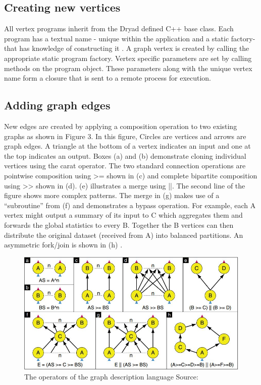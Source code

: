 \documentclass[9pt,twocolumn,twoside]{../../styles/osajnl}
\begin{document}
\subsection{Creating new vertices}
All vertex programs inherit from the Dryad defined C++ base
class. Each program has a textual name - unique within the application
and a static factory- that has knowledge of constructing it
\cite{DryadMSR3}. A graph vertex is created by calling the appropriate
static program factory. Vertex specific parameters are set by calling
methods on the program object. These parameters along with the unique
vertex name form a closure that is sent to a remote process for
execution.


\subsection{Adding graph edges}
New edges are created by applying a composition operation to two
existing graphs as shown in Figure 3. In this figure, Circles are
vertices and arrows are graph edges. A triangle at the bottom of a
vertex indicates an input and one at the top indicates an
output. Boxes (a) and (b) demonstrate cloning individual vertices
using the carat operator. The two standard connection operations are
pointwise composition using >= shown in (c) and complete bipartite
composition using >> shown in (d). (e) illustrates a merge using
||. The second line of the figure shows more complex patterns. The
merge in (g) makes use of a “subroutine” from (f) and demonstrates a
bypass operation. For example, each A vertex might output a summary of
its input to C which aggregates them and forwards the global
statistics to every B. Together the B vertices can then distribute the
original dataset (received from A) into balanced partitions. An
asymmetric fork/join is shown in (h) \cite{DryadMSR3}.
\begin{figure}[htbp]
\begin{center}
\centering
\includegraphics[width=\linewidth]{images/img3}
\caption{The operators of the graph description language Source:\cite{DryadMSR3}}
\label{fig:false-color}
\end{center}
\end{figure}
\end{document}

